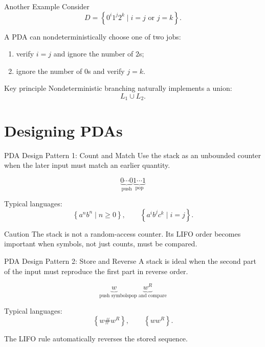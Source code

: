 \documentclass[aspectratio=169,10pt]{beamer}
\newcommand{\lang}[1]{\left\{#1\right\}}
\begin{document}
\begin{frame}{Another Example}
Consider
\[
D=\lang{0^i1^j2^k\mid i=j\text{ or }j=k}.
\]

A PDA can nondeterministically choose one of two jobs:

\begin{enumerate}
    \item verify $i=j$ and ignore the number of $2$s;
    \item ignore the number of $0$s and verify $j=k$.
\end{enumerate}

\vspace{0.8em}
\begin{exampleblock}{Key principle}
Nondeterministic branching naturally implements a union:
\[
L_1\cup L_2.
\]
\end{exampleblock}
\end{frame}

\section{Designing PDAs}

\begin{frame}{PDA Design Pattern 1: Count and Match}
Use the stack as an unbounded counter when the later input must match an earlier quantity.

\[
\underbrace{0\cdots0}_{\text{push}}
\underbrace{1\cdots1}_{\text{pop}}
\]

Typical languages:
\[
\lang{a^nb^n\mid n\ge0},
\qquad
\lang{a^ib^jc^k\mid i=j}.
\]

\begin{alertblock}{Caution}
The stack is not a random-access counter. Its LIFO order becomes important when symbols, not just counts, must be compared.
\end{alertblock}
\end{frame}

\begin{frame}{PDA Design Pattern 2: Store and Reverse}
A stack is ideal when the second part of the input must reproduce the first part in reverse order.

\[
\underbrace{w}_{\text{push symbols}}
\underbrace{w^R}_{\text{pop and compare}}
\]

Typical languages:
\[
\lang{w\#w^R},
\qquad
\lang{ww^R}.
\]

The LIFO rule automatically reverses the stored sequence.
\end{frame}
\end{document}
